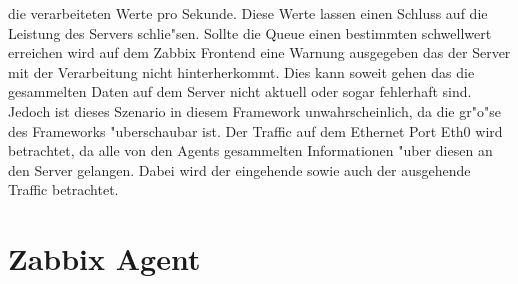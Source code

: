 die verarbeiteten Werte pro Sekunde. Diese Werte lassen einen Schluss auf die Leistung des Servers schlie"sen. %
Sollte die Queue einen bestimmten schwellwert erreichen wird auf dem Zabbix Frontend eine Warnung ausgegeben das der %
Server mit der Verarbeitung nicht hinterherkommt. Dies kann soweit gehen das die gesammelten Daten auf dem Server nicht %
aktuell oder sogar fehlerhaft sind. Jedoch ist dieses Szenario in diesem Framework unwahrscheinlich, da die gr"o"se des %
Frameworks "uberschaubar ist. Der Traffic auf dem Ethernet Port Eth0 wird betrachtet, da alle von den Agents gesammelten Informationen %
"uber diesen an den Server gelangen. Dabei wird der eingehende sowie auch der ausgehende Traffic betrachtet.

\section{Zabbix Agent}

